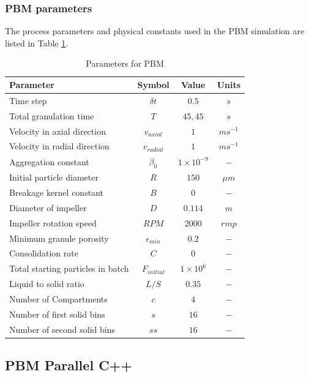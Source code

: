 \documentclass[preprint,11pt,authoryear]{elsarticle}
\begin{document}
\subsubsection{PBM parameters}
The process parameters and physical constants used in the PBM simulation are listed in Table 
\ref{table:mthds_pbm_parameters}.
\begin{table}[H]
\caption{Parameters for PBM}
\label{table:mthds_pbm_parameters}
\begin{center}
\begin{tabular}{l|c|c|c}
\hline
\bf{Parameter} &\bf{Symbol} &\bf{Value} &\bf{Units}\\
\hline
Time step & $\delta t$ & $0.5$ & $s$\\
Total granulation time & $T$ & $45, 45$ & $s$\\
Velocity in axial direction & $v_{axial}$ & $1$ & $ms^{-1}$\\
Velocity in radial direction & $v_{radial}$ & $1$ & $ms^{-1}$\\
Aggregation constant & $\beta_0$ & $1\times10^{-9}$ & $-$\\
Initial particle diameter & $R$ & $150$ & $\mu m$\\
Breakage kernel constant & $B$ & $0$ & $-$\\
Diameter of impeller & $D$ & $0.114$ & $m$ \\
Impeller rotation speed & $RPM$ & $2000$ & $rmp$\\
Minimum granule porosity & $\epsilon_{min}$ & $0.2$ & $-$\\
Consolidation rate & $C$ & $0$ & $-$\\
Total starting particles in batch & $F_{initial}$ & $1 \times 10^{6}$ & $-$\\
Liquid to solid ratio & $L/S$ & $0.35$ & $-$ \\
Number of Compartments & $c$ & $4$ & $-$ \\
Number of first solid bins & $s$ & $16$ & $-$\\
Number of second solid bins & $ss$ & $16$ & $-$\\
\hline
\end{tabular}
\end{center}
\end{table}


\subsection{PBM Parallel C++}
\end{document}
